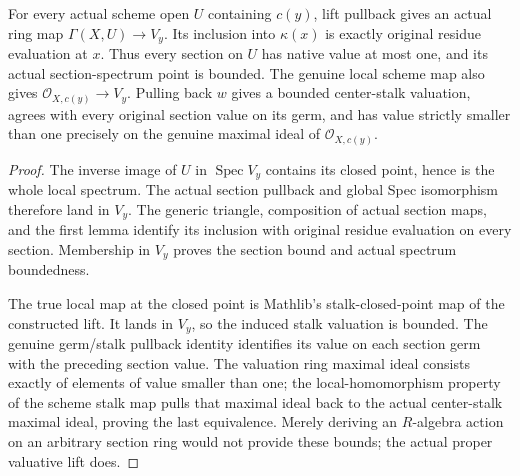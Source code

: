 \begin{theorem}
\label{scheme:proper-center-local-bounds}
\leanok
{}
For every actual scheme open $U$ containing $c(y)$, lift pullback gives an
actual ring map $\Gamma(X,U)\to V_y$. Its inclusion into $\kappa(x)$
is exactly original residue evaluation at $x$. Thus every section on $U$
has native value at most one, and its actual section-spectrum point is bounded.
The genuine local scheme map also gives $\mathcal O_{X,c(y)}\to V_y$.
Pulling back $w$ gives a bounded center-stalk valuation, agrees with every
original section value on its germ, and has value strictly smaller than one
precisely on the genuine maximal ideal of $\mathcal O_{X,c(y)}$.
\end{theorem}
\begin{proof}
The inverse image of $U$ in $\operatorname{Spec}V_y$ contains its closed
point, hence is the whole local spectrum. The actual section pullback and
global Spec isomorphism therefore land in $V_y$. The generic triangle,
composition of actual section maps, and the first lemma identify its inclusion
with original residue evaluation on every section. Membership in $V_y$
proves the section bound and actual spectrum boundedness.

The true local map at the closed point is Mathlib's stalk-closed-point map
of the constructed lift. It lands in $V_y$, so the induced stalk valuation
is bounded. The genuine germ/stalk pullback identity identifies its value
on each section germ with the preceding section value. The valuation ring
maximal ideal consists exactly of elements of value smaller than one; the
local-homomorphism property of the scheme stalk map pulls that maximal ideal
back to the actual center-stalk maximal ideal, proving the last equivalence.
Merely deriving an $R$-algebra action on an arbitrary section ring would not
provide these bounds; the actual proper valuative lift does.
\end{proof}
